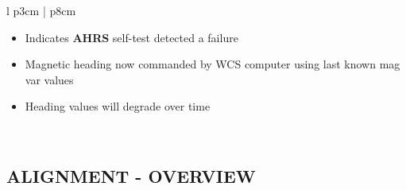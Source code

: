 \documentclass[fontHelvetica]{TechCheck}
\begin{document}
\begin{center}
\begin{longtable}{l p{3cm} | p{8cm}}
\begin{minipage}[t]{\linewidth}
				\vspace{-7pt}
				\begin{itemize}
					\item Indicates \textbf{AHRS} self-test detected a failure
					\item Magnetic heading now commanded by WCS computer using last known mag var values
					\item Heading values will degrade over time
				\end{itemize}
			\end{minipage} \\
			\bottomrule
		\end{longtable}
	\end{center}

	\clearpage

	\subsection{ALIGNMENT - OVERVIEW}
\end{document}

